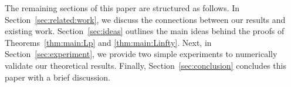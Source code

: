 \documentclass[nohyperref]{article}
\theoremstyle{plain}
\theoremstyle{definition}
\theoremstyle{remark}
\begin{document}
%	



The remaining sections of this paper are structured as follows.
In Section~\ref{sec:related:work}, we discuss the connections between our results and existing work.
Section~\ref{sec:ideas} outlines the main ideas behind the proofs of Theorems~\ref{thm:main:Lp} and \ref{thm:main:Linfty}.
Next, in Section~\ref{sec:experiment}, we provide two simple experiments to numerically validate our theoretical results.
Finally,  Section~\ref{sec:conclusion} concludes this paper with a brief discussion.
\end{document}
